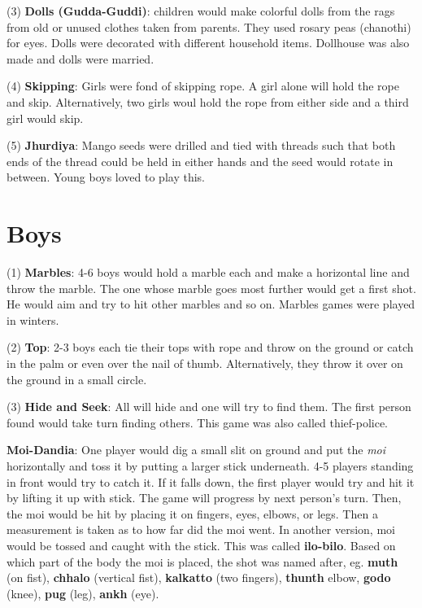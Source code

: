 (3) \textbf{Dolls (Gudda-Guddi)}: children would make colorful dolls from the
rags from old or unused clothes taken from parents. They used rosary peas
(chanothi) for eyes. Dolls were decorated with different household items.
Dollhouse was also made and dolls were married. 

(4) \textbf{Skipping}: Girls were fond of skipping rope. A girl alone will hold
the rope and skip. Alternatively, two girls woul hold the rope from either side
and a third girl would skip. 

(5) \textbf{Jhurdiya}: Mango seeds were drilled and tied with threads such that
both ends of the thread could be held in either hands and the seed would rotate
in between. Young boys loved to play this.


\section{Boys}

(1) \textbf{Marbles}: 4-6 boys would hold a marble each and make a horizontal
line and throw the marble. The one whose marble goes most further would get a
first shot. He would aim and try to hit other marbles and so on. Marbles games
were played in winters.

(2) \textbf{Top}: 2-3 boys each tie their tops with rope and throw on the
ground or catch in the palm or even over the nail of thumb. Alternatively, they
throw it over on the ground in a small circle.

(3) \textbf{Hide and Seek}: All will hide and one will try to find them. The
first person found would take turn finding others. This game was also called
thief-police.

\textbf{Moi-Dandia}: One player would dig a small slit on ground and put the
\textit{moi} horizontally and toss it by putting a larger stick underneath. 4-5
players standing in front would try to catch it. If it falls down, the first
player would try and hit it by lifting it up with stick. The game will progress
by next person's turn. Then, the moi would be hit by placing it on fingers,
eyes, elbows, or legs. Then a measurement is taken as to how far did the moi
went. In another version, moi would be tossed and caught with the stick. This
was called \textbf{ilo-bilo}. Based on which part of the body the moi is
placed, the shot was named after, eg. \textbf{muth} (on fist), \textbf{chhalo}
(vertical fist), \textbf{kalkatto} (two fingers), \textbf{thunth} {elbow},
\textbf{godo} (knee), \textbf{pug} (leg), \textbf{ankh} (eye).

